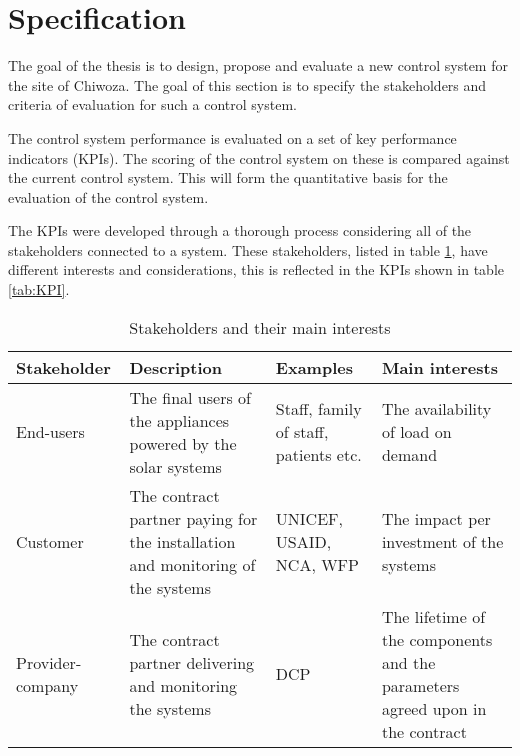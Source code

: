 \section{Specification}\label{seq:specification}
The goal of the thesis is to design, propose and evaluate a new control system for the site of Chiwoza. The goal of this section is to specify the stakeholders and criteria of evaluation for such a control system. 

The control system performance is evaluated on a set of key performance indicators (KPIs). The scoring of the control system on these is compared against the current control system. This will form the quantitative basis for the evaluation of the control system.

The KPIs were developed through a thorough process considering all of the stakeholders connected to a system. These stakeholders, listed in table \ref{tab:stakeholders}, have different interests and considerations, this is reflected in the KPIs shown in table \ref{tab:KPI}. 

\begin{table}[h]
    \centering
    \begin{tabular}{|p{3cm}|p{5cm}|p{2cm}|p{5cm}|}
        \hline
        \textbf{Stakeholder} & \textbf{Description} & \textbf{Examples} & \textbf{Main interests} \\
        \hline
        End-users & The final users of the appliances powered by the solar systems & Staff, family of staff, patients etc. & The availability of load on demand \\
        \hline
        Customer & The contract partner paying for the installation and monitoring of the systems & UNICEF, USAID, NCA, WFP & The impact per investment of the systems \\
        \hline
        Provider-company & The contract partner delivering and monitoring the systems & DCP & The lifetime of the components and the parameters agreed upon in the contract \\
        \hline
    \end{tabular}
    \caption[Stakeholders]{Stakeholders and their main interests}
    \label{tab:stakeholders}
\end{table}

